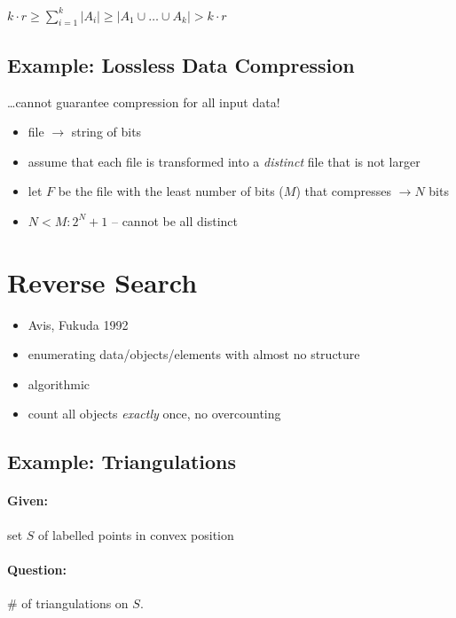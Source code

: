 \documentclass[11pt]{article}
\begin{document}
$ k \cdot r \geq \sum \limits_{i = 1}^k | A_i | \geq | A_1 \cup \dots \cup A_k | > k \cdot r $

\subsection{Example: Lossless Data Compression}

\dots cannot guarantee compression for all input data!

\begin{itemize}
\item file $ \rightarrow $ string of bits
\item assume that each file is transformed into a \textit{distinct} file that is not larger
\item let $ F $ be the file with the least number of bits ($M$) that compresses $\rightarrow N $ bits
\item $ N < M : 2^N + 1 $ – cannot be all distinct
\end{itemize}


\section{Reverse Search}

\begin{itemize}
\item Avis, Fukuda 1992
\item enumerating data/objects/elements with almost no structure
\item algorithmic
\item count all objects \textit{exactly} once, no overcounting
\end{itemize}

\subsection{Example: Triangulations}

\paragraph{Given:} set $ S $ of labelled points in convex position

\paragraph{Question:} \# of triangulations on $ S $.

\end{document}
